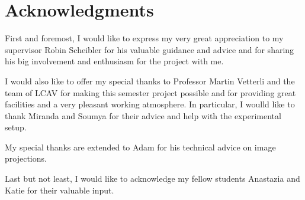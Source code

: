 \section*{Acknowledgments}

First and foremost, I would like to express my very great appreciation to my supervisor Robin Scheibler for his valuable guidance and advice and for sharing his big involvement and enthusiasm for the project with me.  
    
I would also like to offer my special thanks to Professor Martin Vetterli and the team of LCAV for making this semester project possible and for providing great facilities and a very pleasant working atmosphere.
In particular, I woulld like to thank Miranda and Soumya for their advice and help with the experimental setup.

My special thanks are extended to Adam for his technical advice on image projections.

Last but not least, I would like to acknowledge my fellow students Anastazia and Katie for their valuable input. 
